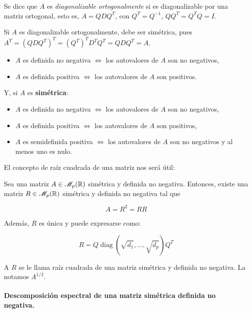 \begin{ndef}
      Se dice que $A$ es \emph{diagonalizable ortogonalmente} si es diagonalizable por una matriz ortogonal, esto es, $A = QDQ^T$, con $Q^T = Q^{-1}$, $QQ^T = Q^TQ = I$.
\end{ndef}
    
\begin{ncor} \label{diag-ort-sim}
              Si $A$ es diagonalizable ortogonalmente, debe ser simétrica, pues $A^T = (QDQ^T)^T = (Q^T)^T D^T Q^T = QDQ^T = A$.
\end{ncor}

\begin{nprop}\hfill
  \begin{itemize}
  \item $A$ es definida no negativa $\iff$ los autovalores de $A$ son no negativos,
  \item $A$ es definida positiva $\iff $ los autovalores de $A$ son positivos.
  \end{itemize}

  Y, si $A$ es \textbf{simétrica}:
  \begin{itemize}
  \item $A$ es definida no negativa $\iff$ los autovalores de $A$ son no negativos,
  \item $A$ es definida positiva $\iff$ los autovalores de $A$ son positivos,
  \item $A$ es semidefinida positiva $\iff$ los autovalores de $A$ son no negativos y al menos uno es nulo.
  \end{itemize}
\end{nprop}


El concepto de raíz cuadrada de una matriz nos será útil:
\begin{nprop}
  Sea una matriz $A\in \mathscr{M}_{p}(\mathbb{R})$ simétrica y definida no negativa. Entonces, existe una matriz $R\in \mathscr{M}_{p}(\mathbb{R})$ simétrica y definida no negativa tal que
  
  \[
  A = R^2 = RR
  \]
  
  Además, $R$ es única y puede expresarse como:

  \[
  R = Q \operatorname{diag}\left(\sqrt{d_1}, \dots, \sqrt{d_p}\right) Q^T
  \]
  
  A $R$  se le llama raíz cuadrada de una matriz simétrica y definida no negativa. La notamos $A^{1/2}$.
\end{nprop}

\paragraph{Descomposición espectral de una matriz simétrica definida no negativa.}\hfill

